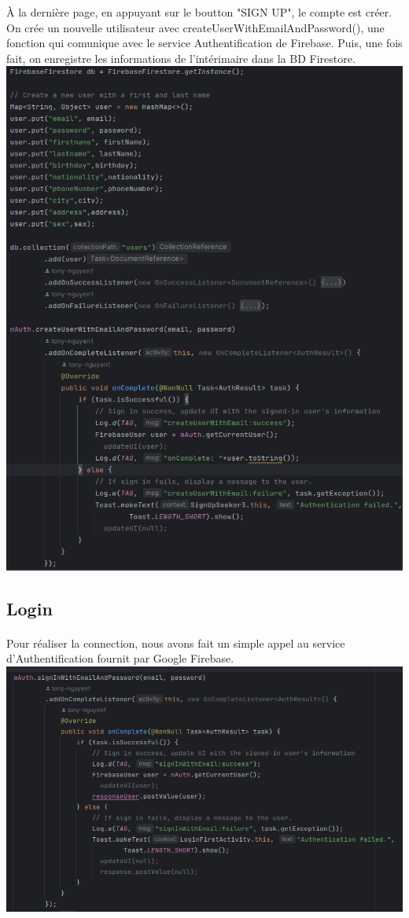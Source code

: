 \documentclass[a4paper]{article}
\begin{document}
\begin{multicols}{2}
        À la dernière page, en appuyant sur le boutton "SIGN UP", le compte est créer. On crée un nouvelle utilisateur avec createUserWithEmailAndPassword(), une fonction qui comunique avec le service Authentification de Firebase. Puis, une fois fait, on enregistre les informations de l'intérimaire dans la BD Firestore. 
        \noindent\includegraphics[width=.49\textwidth]{codeSignUp}
        \subsection{Login}
        \paragraph{}
        Pour réaliser la connection, nous avons fait un simple appel au service d'Authentification fournit par Google Firebase. 
        \noindent\includegraphics[width=.49\textwidth]{codeSignInA}
        

\end{multicols}
\end{document}
